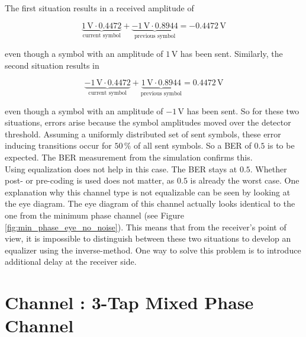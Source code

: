 \documentclass[10pt, a4paper]{article}
\newcommand{\upperRomannumeral}[1]{\uppercase\expandafter{\romannumeral#1}}
\begin{document}
The first situation results in a received amplitude of

$$\underbrace{1\,\si{\volt} \cdot 0.4472}_{\text{current symbol}} + \underbrace{-1\,\si{\volt}\cdot 0.8944}_{\text{previous symbol}} = -0.4472\,\si{\volt}$$

even though a symbol with an amplitude of $1\,\si{\volt}$ has been sent. Similarly, the second situation results in

$$\underbrace{-1\,\si{\volt} \cdot 0.4472}_{\text{current symbol}} + \underbrace{1\,\si{\volt}\cdot 0.8944}_{\text{previous symbol}} = 0.4472\,\si{\volt}$$

even though a symbol with an amplitude of $-1\,\si{\volt}$ has been sent. So for these two situations, errors arise because the symbol amplitudes moved over the detector threshold. Assuming a uniformly distributed set of sent symbols, these error inducing transitions occur for $50\,\si{\percent}$ of all sent symbols. So a BER of $0.5$ is to be expected. The BER measurement from the simulation confirms this.\\

Using equalization does not help in this case. The BER stays at $0.5$. Whether post- or pre-coding is used does not matter, as $0.5$ is already the worst case. One explanation why this channel type is not equalizable can be seen by looking at the eye diagram. The eye diagram of this channel actually looks identical to the one from the minimum phase channel (see Figure \ref{fig:min_phase_eye_no_noise}). This means that from the receiver's point of view, it is impossible to distinguish between these two situations to develop an equalizer using the inverse-method. One way to solve this problem is to introduce additional delay at the receiver side.\\



\section{Channel \upperRomannumeral{2}: 3-Tap Mixed Phase Channel}
\end{document}
